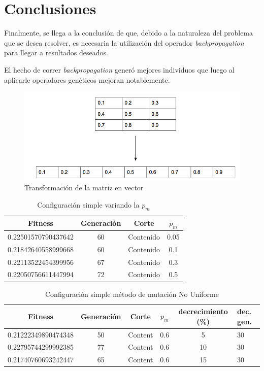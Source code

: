 \documentclass{sig-alternate}
\begin{document}
\section{Conclusiones}
Finalmente, se llega a la conclusión de que, debido a la naturaleza del
problema que se desea resolver, es necesaria la utilización del
operador \textit{backpropagation} para llegar a resultados deseados.

El hecho de correr \textit{backpropagation} generó mejores individuos que
luego al aplicarle operadores genéticos mejoran notablemente.

\onecolumn
\begin{figure}[ht]
		\includegraphics[scale=0.5]{./figures/matrix_to_array.png}
  		\caption{Transformación de la matriz en vector}
  		\label{fig:indiv}
	\end{figure}

\begin{table}[htp]
	\begin{center}
	\begin{tabular}{|c|c|c|c|}
		\hline
	     Fitness & Generación & Corte & $p_{m}$ \\
		\hline
		0.22501570790437642 & 60 & Contenido & 0.05 \\
		0.21842640558999668 & 60 & Contenido & 0.1 \\
		0.22113522454399956 & 67 & Contenido & 0.3 \\ 
		0.22050756611447994 & 72 & Contenido & 0.5 \\
		\hline
	\end{tabular}
	\caption{Configuración simple variando la $p_m$}
	\label{table:simple_mutation_prob}
	\end{center}
\end{table}

\begin{table}[htp]
	\begin{center}
	\begin{tabular}{|c|c|c|c|c|p{1cm}|}
		\hline
	     Fitness & Generación & Corte & $p_{m}$ & decrecimiento (\%) & dec. gen. \\
		\hline
		0.21222349890474348 & 50 & Content & 0.6 & 5 & 30 \\
		0.22795744299992385 & 77 & Content & 0.6 & 10  & 30 \\
		0.21740760693242447 & 65 & Content & 0.6 & 15 & 30 \\
		\hline
	\end{tabular}
	\caption{Configuración simple método de mutación No Uniforme}
	\label{table:simple_mutation_no_uniform}
	\end{center}
\end{table}
\end{document}
